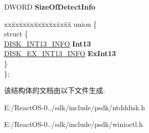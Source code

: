 \begin{DoxyCompactItemize}
\begin{tabbing}
\end{tabbing}\item 
\mbox{\label{struct___d_i_s_k___d_e_t_e_c_t_i_o_n___i_n_f_o_af2e11b450fd5b74c553c0abeceb398f8}} 
D\+W\+O\+RD {\bfseries Size\+Of\+Detect\+Info}
\item 
\mbox{\label{struct___d_i_s_k___d_e_t_e_c_t_i_o_n___i_n_f_o_aae0222bdb3d07da6436998fade516d2f}} 
\begin{tabbing}
xx\=xx\=xx\=xx\=xx\=xx\=xx\=xx\=xx\=\kill
union \{\\
\mbox{\label{union___d_i_s_k___d_e_t_e_c_t_i_o_n___i_n_f_o_1_1_0D2869_af0e368bc5c0d8545bd706c85979a1e3f}} 
\>struct \{\\
\>\>\hyperlink{struct___d_i_s_k___i_n_t13___i_n_f_o}{DISK\_INT13\_INFO} {\bfseries Int13}\\
\>\>\hyperlink{struct___d_i_s_k___e_x___i_n_t13___i_n_f_o}{DISK\_EX\_INT13\_INFO} {\bfseries ExInt13}\\
\>\} \\
\}; \\

\end{tabbing}\end{DoxyCompactItemize}


该结构体的文档由以下文件生成\+:\begin{DoxyCompactItemize}
\item 
E\+:/\+React\+O\+S-\/0../sdk/include/psdk/ntdddisk.\+h\item 
E\+:/\+React\+O\+S-\/0../sdk/include/psdk/winioctl.\+h\end{DoxyCompactItemize}
